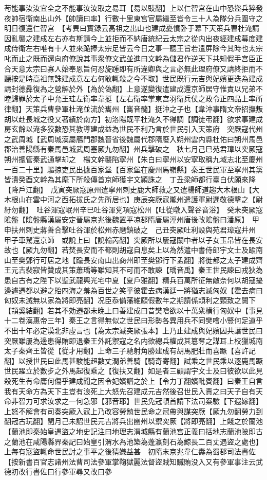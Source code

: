 苟能事汝汝宜全之不能事汝汝取之易耳【易以豉翻】上以仁智宫在山中恐盜兵猝發夜帥宿衛南出山外【帥讀曰率】行數十里東宫官屬繼至皆令三十人為隊分兵圍守之明日復還仁智宫　【考異曰實録云高祖之出山也建成憂憤卧于幕下天策兵曹杜淹請因亂襲之建成左右亦有斯請今上並拒而不納唐統紀云太宗之從内出夜經建成幕度建成侍衛左右唯有十人並來跪捧太宗足皆云今日之事一聽王旨若遣屏除今其時也太宗叱而止之既而還向府僚說其事衆僚文武並進曰文幹為儲君作逆天下共知假手宫臣正合天意太宗曰寡人始奉恩旨何忍旋踵即有所違卿與之言必無此理府僚又請終拒而不聽按是時高祖無誅建成意左右何敢輒殺之今不取】世民既行元吉與妃嬪更迭為建成請封德彞復為之營解於外【為於偽翻】上意遂變復遣建成還京師居守惟責以兄弟不睦歸罪於太子中允王珪左衛率韋挺【左右衛率掌東宫羽衛兵仗之政令正四品上率所律翻】天策兵曹參軍杜淹並流於巂州【巂音髓】挺沖之子也【韋沖事隋文帝招撫叛胡以赴長城之役又著績於南方】初洛陽既平杜淹久不得調【調徒弔翻】欲求事建成房玄齡以淹多狡數恐其教導建成益為世民不利乃言於世民引入天策府　突厥寇代州之武周城【武周城漢屬鴈門郡魏晉省後魏屬代郡隋廢入朔州雲内縣杜佑曰朔州馬邑郡治善陽縣有秦馬邑城武周塞厥九勿翻】州兵擊破之　秋七月己巳苑君璋以突厥寇朔州摠管秦武通擊却之　楊文幹襲陷寧州【朱白曰寧州以安寧取稱九域志北至慶州一百二十里】驅掠吏民出據百家堡【百家堡在慶州馬嶺縣】秦王世民軍至寧州其黨皆潰癸酉文幹為其麾下所殺傳首京師獲宇文頴誅之　丁丑梁師都行臺白伏願來降【降戶江翻】　戊寅突厥寇原州遣寧州刺史鹿大師救之又遣楊師道趨大木根山【大木根山在雲中河之西拓拔氏之先所居也】庚辰突厥寇隴州遣護軍尉遲敬德擊之【尉紆勿翻】　吐谷渾寇岷州辛巳吐谷渾党項寇松州【吐從暾入聲谷音浴】　癸未突厥寇隂盤【隂盤縣漢屬安定晉屬京兆後魏置平凉郡隋唐屬涇州唐後改隂盤曰潘原】　甲申扶州刺史蔣善合擊吐谷渾於松州赤磨鎮破之　己丑突厥吐利設與苑君璋寇并州　甲子車駕還京師　或說上曰【說輸芮翻】突厥所以屢寇關中者以子女玉帛皆在長安故也【厥九勿翻】若焚長安而不都則胡寇自息矣上以為然遣中書侍郎宇文士及踰南山至樊鄧行可居之地【踰長安南山出商州即至樊鄧行下孟翻】將徙都之太子建成齊王元吉裴寂皆贊成其策蕭瑀等雖知其不可而不敢諫【瑀音禹】秦王世民諫曰戎狄為患自古有之陛下以聖武龍興光宅中夏【夏戶雅翻】精兵百萬所征無敵奈何以胡寇擾邊遽遷都以避之貽四海之羞為百世之笑乎彼霍去病漢廷一將猶志滅匈奴【霍去病曰匈奴未滅無以家為將即亮翻】况臣忝備藩維願假數年之期請係頡利之頸致之闕下【頡奚結翻】若其不効遷都未晚上曰善建成曰昔樊噲欲以十萬衆横行匈奴中【事見十二卷漢惠帝三年】秦王之言得無似之世民曰形勢各異用兵不同樊噲小豎何足道乎不出十年必定漠北非虛言也【為太宗滅突厥張本】上乃止建成與妃嬪因共譖世民曰突厥雖屢為邊患得賄即退秦王外託禦寇之名内欲總兵權成其簒奪之謀耳上校獵城南太子秦齊王皆從【從才用翻】上命三子馳射角勝建成有胡馬肥壯而喜蹶【喜許記翻】以授世民曰此馬甚駿能超數丈澗弟善騎【騎奇寄翻】試乘之世民乘以逐鹿馬蹶世民躍立於數步之外馬起復乘之【復扶又翻】如是者三顧謂宇文士及曰彼欲以此見殺死生有命庸何傷乎建成聞之因令妃嬪譖之於上【令力丁翻嬪毗賓翻】曰秦王自言我有天命方為天下主豈有浪死上大怒先召建成元吉然後召世民入責之曰天子自有天命非智力可求汝求之一何急邪【邪音耶】世民免冠頓首請下法司案驗【下遐嫁翻】上怒不解會有司奏突厥入寇上乃改容勞勉世民命之冠帶與謀突厥【厥九勿翻勞力到翻冠古玩翻】閏月己未詔世民元吉將兵出豳州以禦突厥【將即亮翻】上餞之於蘭池【蘭池即秦始皇遇盜之地史記注曰地理志渭城縣有蘭池宫正義曰括地志蘭池陂即古之蘭池在咸陽縣界秦記曰始皇引渭水為池築為蓬瀛刻石為鯨長二百丈遇盜之處也】上每有寇盜輒命世民討之事平之後猜嫌益甚　初隋末京兆韋仁夀為蜀郡司法書佐【按新書百官志諸州法曹司法參軍掌鞠獄麗法督盜賊知贓賄没入又有參軍事注云武德初改行書佐曰行參軍尋又改曰參